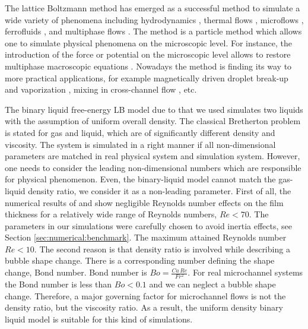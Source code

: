 \documentclass[preprint,12pt]{elsarticle}
\begin{document}
The lattice Boltzmann method has emerged as a successful method to simulate
a wide variety of phenomena including hydrodynamics \cite{yu}, thermal flows
\cite{karlin-minimalmodels}, microflows \cite{ansumali-small-knudsen},
ferrofluids \cite{kuzmin-aniso}, and multiphase flows
\cite{swift,Shan-chen:extended}. The method is a particle method which allows one to simulate physical
phenomena on the microscopic level. For instance, the introduction of the force or potential on the
microscopic level allows to restore multiphase macroscopic equations \cite{swift,
Shan-chen:extended}. {\color{red} Nowadays the method is finding its way to more practical
applications, for example magnetically driven droplet break-up and vaporization
\cite{falcucci-vapour}, mixing in cross-channel flow \cite{jos-mixing}, etc. }

The binary liquid free-energy LB model due to \citet{swift} that we used
simulates two liquids with the assumption of uniform overall
density. 
The classical Bretherton
problem is stated for gas and liquid, which are of
significantly
different density and viscosity. {\color{red} The system is simulated in a right manner if all
non-dimensional parameters are matched in real physical system and simulation system.
However, one needs to consider the leading non-dimensional numbers which are responsible for
physical phenomenon. Even, the binary-liquid model cannot match the gas-liquid density ratio, we
consider it as a non-leading parameter. First of all, the numerical
results of
\citet{giavedoni-numerical} and \citet{heil-bretherton} show
negligible Reynolds number effects on the film thickness for a relatively wide range of Reynolds
numbers, $Re<70$. The parameters in our simulations were carefully chosen to
avoid  inertia
effects, see Section \ref{sec:numerical:benchmark}. The maximum attained
Reynolds number $Re<10$. The second reason is that density ratio is involved while describing a
bubble shape change. There is a corresponding number defining the shape change, Bond number. Bond
number is $Bo=\frac{Ca\,Re}{Fr^2}$. For real microchannel systems the Bond number is less than
$Bo<0.1$ and we can neglect a bubble shape change.}
Therefore, a major governing
factor for microchannel flows is not the density ratio, but
the
viscosity ratio. As a result, the uniform density binary liquid model is suitable for this kind of
simulations.  
\end{document}
